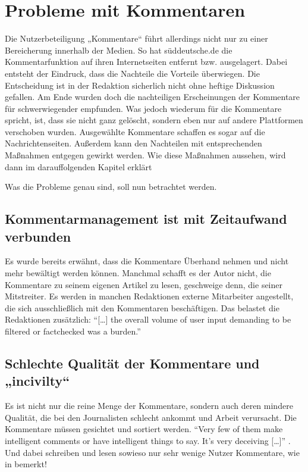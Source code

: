 \chapter{Probleme mit Kommentaren} \label{kap:probleme}

Die Nutzerbeteiligung „Kommentare“ führt allerdings nicht nur zu einer
Bereicherung innerhalb der Medien. So hat süddeutsche.de die Kommentarfunktion
auf ihren Internetseiten entfernt bzw. ausgelagert. Dabei entsteht der Eindruck,
dass die Nachteile die Vorteile überwiegen. Die Entscheidung ist in der
Redaktion sicherlich nicht ohne heftige Diskussion gefallen. Am Ende wurden doch
die nachteiligen Erscheinungen der Kommentare für schwerwiegender empfunden. Was
jedoch wiederum für die Kommentare spricht, ist, dass sie nicht ganz gelöscht,
sondern eben nur auf andere Plattformen verschoben wurden. Ausgewählte
Kommentare schaffen es sogar auf die Nachrichtenseiten. Außerdem kann den
Nachteilen mit entsprechenden Maßnahmen entgegen gewirkt werden. Wie diese
Maßnahmen aussehen, wird dann im darauffolgenden Kapitel erklärt

Was die Probleme genau sind, soll nun betrachtet werden.

\section{Kommentarmanagement ist mit Zeitaufwand verbunden}

Es wurde bereits erwähnt, dass die Kommentare Überhand nehmen und nicht mehr
bewältigt werden können. Manchmal schafft es der Autor nicht, die Kommentare zu
seinem eigenen Artikel zu lesen, geschweige denn, die seiner Mitstreiter. Es
werden in manchen Redaktionen externe Mitarbeiter angestellt, die sich
ausschließlich mit den Kommentaren beschäftigen. Das belastet die Redaktionen
zusätzlich: ``[\ldots] the overall volume of user input demanding to be filtered
or factchecked was a burden.'' \autocite[S.~172]{quandt}


\section{Schlechte Qualität der Kommentare und „incivilty“}

Es ist nicht nur die reine Menge der Kommentare, sondern auch deren mindere
Qualität, die bei den Journalisten schlecht ankommt und Arbeit verursacht. Die
Kommentare müssen gesichtet und sortiert werden. ``Very few of them make
intelligent comments or have intelligent things to say. It's very deceiving
[\ldots]'' \autocite[S.~ 103]{reich}. Und dabei schreiben und lesen sowieso nur
sehr wenige Nutzer Kommentare, wie in
bemerkt!

